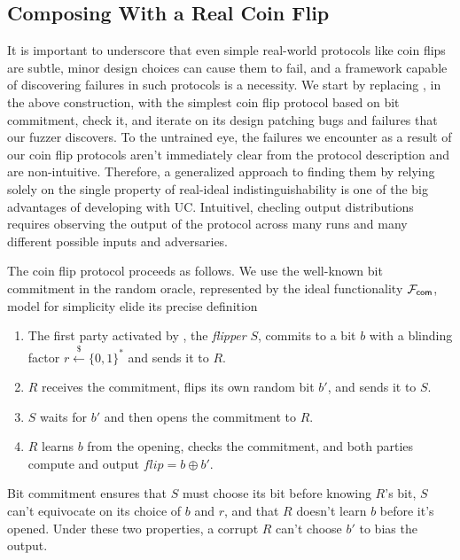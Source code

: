 \subsection{Composing With a Real Coin Flip}
It is important to underscore that even simple real-world protocols like coin
flips are subtle, minor design choices can cause them to fail, and a framework
capable of discovering failures in such protocols is a necessity.  We start by
replacing \Fcoin, in the above construction, with the simplest coin flip
protocol based on bit commitment, check it, and iterate on its design patching
bugs and failures that our fuzzer discovers.
To the untrained eye, the failures we encounter as a result of our coin flip
protocols aren't immediately clear from the protocol description and are
non-intuitive.  Therefore, a generalized approach to finding them by relying
solely on the single property of real-ideal indistinguishability is one of the
big advantages of developing with UC.  Intuitivel, checling output
distributions requires observing the output of the protocol across many runs
and many different possible inputs and adversaries.

The coin flip protocol proceeds as follows. We use the well-known bit
commitment in the random oracle, represented by the ideal functionality
$\mathcal{F}_{{\mathsf {com}}}$, model for simplicity  elide its precise definition
\begin{enumerate}
    \item The first party activated by \Z, the \emph{flipper} $S$, commits to a
        bit $b$ with a blinding factor $r \xleftarrow{\$} \{0,1\}^*$ and sends it
        to $R$.  
    \item $R$ receives the commitment, flips its own random bit $b'$, and sends
        it to $S$.
    \item $S$ waits for $b'$ and then opens the commitment to $R$.
    \item $R$ learns $b$ from the opening, checks the commitment, and both
        parties compute and output $flip = b \oplus b'$.
\end{enumerate}
Bit commitment ensures that $S$ must choose its bit before knowing $R$'s bit,
$S$ can't equivocate on its choice of $b$ and $r$, and that $R$ doesn't learn
$b$ before it's opened. Under these two properties, a corrupt $R$ can't choose
$b'$ to bias the output.

